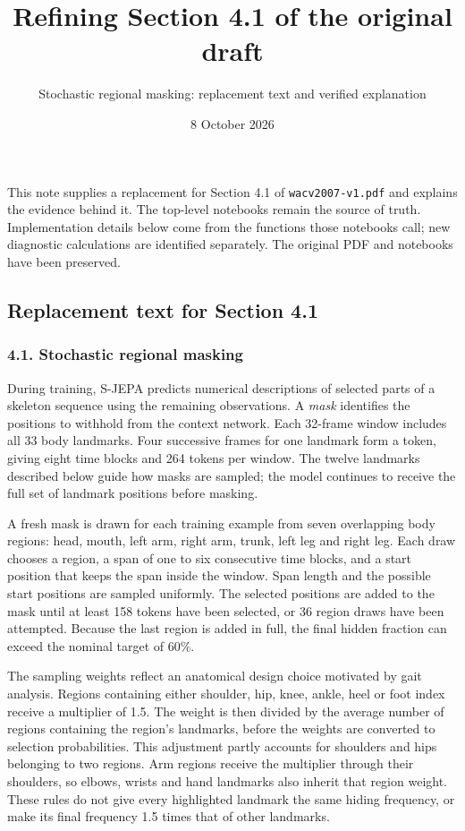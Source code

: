 \documentclass[
  11pt,
]{article}
\title{Refining Section 4.1 of the original draft}
\subtitle{Stochastic regional masking: replacement text and verified
explanation}
\author{}
\date{8 October 2026}
\makeatletter
\renewcommand{\maketitle}{\noindent{\LARGE\@title\par}\vspace{0.6em}
\noindent{\small\@date\par}\vspace{1em}}
\makeatother
\begin{document}
\maketitle

This note supplies a replacement for Section 4.1 of
\texttt{wacv2007-v1.pdf} and explains the evidence behind it. The
top-level notebooks remain the source of truth. Implementation details
below come from the functions those notebooks call; new diagnostic
calculations are identified separately. The original PDF and notebooks
have been preserved.

\subsection{Replacement text for Section
4.1}\label{replacement-text-for-section-4.1}

\subsubsection{4.1. Stochastic regional
masking}\label{stochastic-regional-masking}

During training, S-JEPA predicts numerical descriptions of selected
parts of a skeleton sequence using the remaining observations. A
\emph{mask} identifies the positions to withhold from the context
network. Each 32-frame window includes all 33 body landmarks. Four
successive frames for one landmark form a token, giving eight time
blocks and 264 tokens per window. The twelve landmarks described below
guide how masks are sampled; the model continues to receive the full set
of landmark positions before masking.

A fresh mask is drawn for each training example from seven overlapping
body regions: head, mouth, left arm, right arm, trunk, left leg and
right leg. Each draw chooses a region, a span of one to six consecutive
time blocks, and a start position that keeps the span inside the window.
Span length and the possible start positions are sampled uniformly. The
selected positions are added to the mask until at least 158 tokens have
been selected, or 36 region draws have been attempted. Because the last
region is added in full, the final hidden fraction can exceed the
nominal target of 60\%.

The sampling weights reflect an anatomical design choice motivated by
gait analysis. Regions containing either shoulder, hip, knee, ankle,
heel or foot index receive a multiplier of 1.5. The weight is then
divided by the average number of regions containing the region's
landmarks, before the weights are converted to selection probabilities.
This adjustment partly accounts for shoulders and hips belonging to two
regions. Arm regions receive the multiplier through their shoulders, so
elbows, wrists and hand landmarks also inherit that region weight. These
rules do not give every highlighted landmark the same hiding frequency,
or make its final frequency 1.5 times that of other landmarks.
\end{document}
